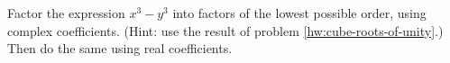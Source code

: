 Factor the expression $x^3-y^3$ into factors of the lowest possible
order, using complex coefficients. (Hint: use the result of problem 
\ref{hw:cube-roots-of-unity}.) Then do the same using real
coefficients.                                                                                                     
